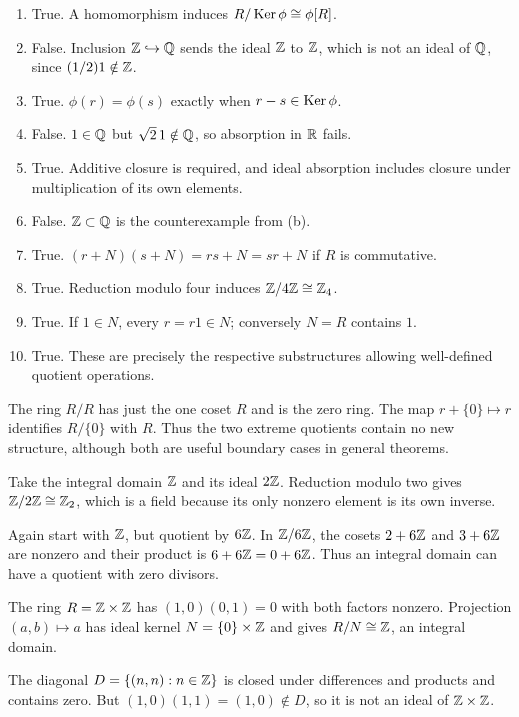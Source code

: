 \begin{enumerate}[label=(\alph*)]
\item True. A homomorphism induces $R/\operatorname{Ker}\phi\cong\phi[R]$.
\item False. Inclusion $\mathbb{Z}\hookrightarrow\mathbb{Q}$ sends the ideal $\mathbb{Z}$ to $\mathbb{Z}$, which is not an ideal of $\mathbb{Q}$, since $(1/2)1\notin\mathbb{Z}$.
\item True. $\phi(r)=\phi(s)$ exactly when $r-s\in\operatorname{Ker}\phi$.
\item False. $1\in\mathbb{Q}$ but $\sqrt2\,1\notin\mathbb{Q}$, so absorption in $\mathbb{R}$ fails.
\item True. Additive closure is required, and ideal absorption includes closure under multiplication of its own elements.
\item False. $\mathbb{Z}\subset\mathbb{Q}$ is the counterexample from (b).
\item True. $(r+N)(s+N)=rs+N=sr+N$ if $R$ is commutative.
\item True. Reduction modulo four induces $\mathbb{Z}/4\mathbb{Z}\cong\mathbb{Z}_4$.
\item True. If $1\in N$, every $r=r1\in N$; conversely $N=R$ contains $1$.
\item True. These are precisely the respective substructures allowing well-defined quotient operations.
\end{enumerate}

The ring $R/R$ has just the one coset $R$ and is the zero ring. The map $r+\{0\}\mapsto r$ identifies $R/\{0\}$ with $R$. Thus the two extreme quotients contain no new structure, although both are useful boundary cases in general theorems.

Take the integral domain $\mathbb{Z}$ and its ideal $2\mathbb{Z}$. Reduction modulo two gives $\mathbb{Z}/2\mathbb{Z}\cong\mathbb{Z}_2$, which is a field because its only nonzero element is its own inverse.

Again start with $\mathbb{Z}$, but quotient by $6\mathbb{Z}$. In $\mathbb{Z}/6\mathbb{Z}$, the cosets $2+6\mathbb{Z}$ and $3+6\mathbb{Z}$ are nonzero and their product is $6+6\mathbb{Z}=0+6\mathbb{Z}$. Thus an integral domain can have a quotient with zero divisors.

The ring $R=\mathbb{Z}\times\mathbb{Z}$ has $(1,0)(0,1)=0$ with both factors nonzero. Projection $(a,b)\mapsto a$ has ideal kernel $N=\{0\}\times\mathbb{Z}$ and gives $R/N\cong\mathbb{Z}$, an integral domain.

The diagonal $D=\{(n,n):n\in\mathbb{Z}\}$ is closed under differences and products and contains zero. But $(1,0)(1,1)=(1,0)\notin D$, so it is not an ideal of $\mathbb{Z}\times\mathbb{Z}$.

